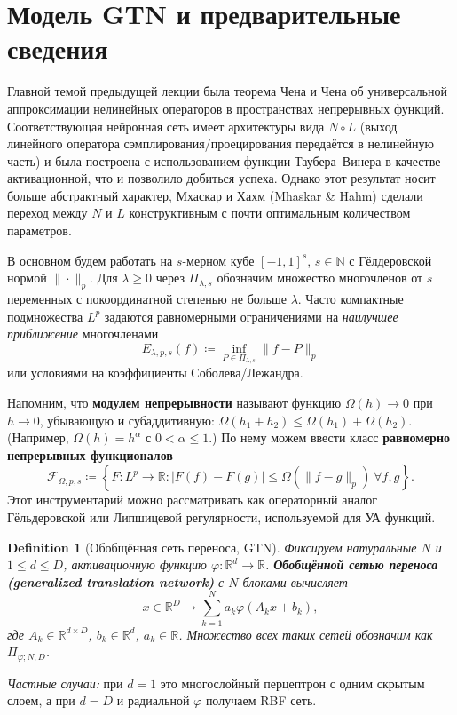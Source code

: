 \documentclass[12pt]{article}
\newtheorem{definition}{Definition}
\begin{document}
\renewcommand{\baselinestretch}{1.5}
\renewcommand{\contentsname}{Содержание}

\tableofcontents
\newpage

\section{Модель GTN и предварительные сведения}
Главной темой предыдущей лекции была теорема Чена и Чена об универсальной аппроксимации нелинейных операторов в пространствах непрерывных функций.
Соответствующая нейронная сеть имеет архитектуры вида \(N \circ L\) (выход линейного оператора сэмплирования/проецирования передаётся в нелинейную часть) и была построена с использованием функции Таубера--Винера в качестве активационной, что и позволило добиться успеха.
Однако этот результат носит больше абстрактный характер, Мхаскар и Хахм (Mhaskar \& Hahm) сделали переход между \(N\) и \(L\) конструктивным с почти оптимальным количеством параметров.

В основном будем работать на \(s\)-мерном кубе \([-1, 1]^s\), \(s \in \mathbb{N}\) с Гёлдеровской нормой \(\|\cdot\|_p\).
Для \(\lambda \ge 0\) через \(\Pi_{\lambda,s}\) обозначим множество многочленов от \(s\) переменных с покоординатной степенью не больше \(\lambda\).
Часто компактные подмножества \(L^p\) задаются равномерными ограничениями на \emph{наилучшее приближение} многочленами
\[E_{\lambda,p,s}(f) \coloneq \inf_{P \in \Pi_{\lambda,s}} \|f - P\|_p\]
или условиями на коэффициенты Соболева/Лежандра.

Напомним, что \textbf{модулем непрерывности} называют функцию \(\Omega(h) \to 0\) при \(h \to 0\), убывающую и субаддитивную: \(\Omega(h_1 + h_2) \le \Omega(h_1) + \Omega(h_2)\). (Например, \(\Omega(h) = h^\alpha\) с \(0 < \alpha \le 1\).)
По нему можем ввести класс \textbf{равномерно непрерывных функционалов}
\[\mathcal{F}_{\Omega,p,s} \coloneq \left\{ F\colon L^p \to \mathbb{R} : |F(f) - F(g)| \le \Omega(\|f - g\|_p) \ \forall f,g \right\}.\]
Этот инструментарий можно рассматривать как операторный аналог Гёльдеровской или Липшицевой регулярности, используемой для УА функций.
\begin{definition}[Обобщённая сеть переноса, GTN]
  Фиксируем натуральные \(N\) и \(1 \le d \le D\), активационную функцию \(\varphi \colon \mathbb{R}^d \to \mathbb{R}\).
  \textbf{Обобщённой сетью переноса (generalized translation network)} с \(N\) блоками вычисляет
  \[x \in \mathbb{R}^{D} \longmapsto \sum_{k=1}^{N} a_k \varphi(A_k x + b_k),\]
  где \(A_k \in \mathbb{R}^{d \times D}\), \(b_k \in \mathbb{R}^d\), \(a_k \in \mathbb{R}\).
  Множество всех таких сетей обозначим как \(\Pi_{\varphi;N,D}\).
\end{definition}
\textit{Частные случаи:} при \(d = 1\) это многослойный перцептрон с одним скрытым слоем, а при \(d = D\) и радиальной \(\varphi\) получаем RBF сеть.
\end{document}
